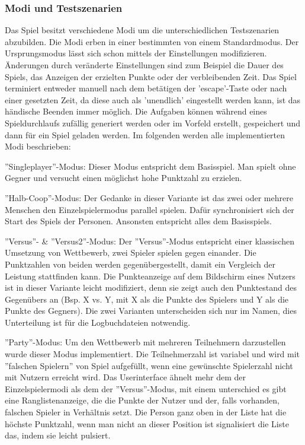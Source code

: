 \subsubsection{Modi und Testszenarien}
Das Spiel besitzt verschiedene Modi um die unterschiedlichen Testszenarien abzubilden. Die Modi erben in einer bestimmten von einem Standardmodus. Der Ursprungsmodus lässt sich schon mittels der Einstellungen modifizieren. Änderungen durch veränderte Einstellungen sind zum Beispiel die Dauer des Spiels, das Anzeigen der erzielten Punkte oder der verbleibenden Zeit. Das Spiel terminiert entweder manuell nach dem betätigen der 'escape'-Taste oder nach einer gesetzten Zeit, da diese auch als 'unendlich' eingestellt werden kann, ist das händische Beenden immer möglich. Die Aufgaben können während eines Spieldurchlaufs zufällig generiert werden oder im Vorfeld erstellt, gespeichert und dann für ein Spiel geladen werden. Im folgenden werden alle implementierten Modi beschrieben:\itemize
\item''Singleplayer''-Modus:\newline
Dieser Modus entspricht dem Basisspiel. Man spielt ohne Gegner und versucht einen möglichst hohe Punktzahl zu erzielen.
\item''Halb-Coop''-Modus:\newline{}
Der Gedanke in dieser Variante ist das zwei oder mehrere Menschen den Einzelspielermodus parallel spielen. Dafür synchronisiert sich der Start des Spiels der Personen. Ansonsten entspricht alles dem Basisspiels.
\item''Versus''- \& ''Versus2''-Modus:\newline
Der ''Versus''-Modus entspricht einer klassischen Umsetzung von Wettbewerb, zwei Spieler spielen gegen einander. Die Punktzahlen von beiden werden gegenübergestellt, damit ein Vergleich der Leistung stattfinden kann. Die Punkteanzeige auf dem Bildschirm eines Nutzers ist in dieser Variante leicht modifiziert,  denn sie zeigt  auch den Punktestand des Gegenübers an (Bsp. X vs. Y, mit X als die Punkte des Spielers und Y als die Punkte des Gegners). Die zwei Varianten unterscheiden sich nur im Namen, dies Unterteilung ist für die Logbuchdateien notwendig.
\item''Party''-Modus:\newline
Um den Wettbewerb mit mehreren Teilnehmern darzustellen wurde dieser Modus implementiert. Die Teilnehmerzahl ist variabel und wird mit ''falschen Spielern'' von Spiel aufgefüllt, wenn eine gewünschte Spielerzahl nicht mit Nutzern erreicht wird. Das Userinterface ähnelt mehr dem der Einzelspielermodi als dem der ''Versus''-Modus, mit einem unterschied es gibt eine Ranglistenanzeige, die die Punkte der Nutzer und der, falls vorhanden, falschen Spieler in Verhältnis setzt. Die Person ganz oben in der Liste hat die höchste Punktzahl, wenn man nicht an dieser Position ist signalisiert die Liste das, indem sie leicht pulsiert.
